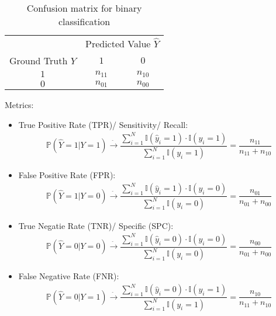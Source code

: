 \begin{table}[H]
    \centering
    \renewcommand\arraystretch{1}
    \caption{Confusion matrix for binary classification}
    \begin{tabular}{ccc}
        \hline
        \hline
        &\multicolumn{2}{c}{Predicted Value $ \hat{Y} $}\\
        \cline{2-3}
        Ground Truth $ Y $&$ 1 $&$ 0 $\\
        \hline
        $ 1 $&$ n_{11} $&$ n_{10} $\\
        $ 0  $&$ n_{01} $&$ n_{00} $\\
        \hline
        \hline
    \end{tabular}
    \label{}
\end{table}

Metrics:
\begin{itemize}[topsep=2pt,itemsep=0pt]
    \item True Positive Rate (TPR)/ Sensitivity/ Recall:
    \begin{align}
        \mathbb{P}\left( \hat{Y}=1|Y=1 \right)\xrightarrow[]{\hat{ }}\dfrac{\sum_{i=1}^N\mathbb{I}(\hat{y}_i=1)\cdot\mathbb{I}(y_i=1)}{\sum_{i=1}^N\mathbb{I}(y_i=1)} =\dfrac{n_{11}}{n_{11}+n_{10}}
    \end{align}
    \item False Positive Rate (FPR):
    \begin{align}
        \mathbb{P}\left( \hat{Y}=1|Y=0 \right)\xrightarrow[]{\hat{ }}\dfrac{\sum_{i=1}^N\mathbb{I}(\hat{y}_i=1)\cdot\mathbb{I}(y_i=0)}{\sum_{i=1}^N\mathbb{I}(y_i=0)} =\dfrac{n_{01}}{n_{01}+n_{00}}
    \end{align}
    \item True Negatie Rate (TNR)/ Specific (SPC):
    \begin{align}
        \mathbb{P}\left( \hat{Y}=0|Y=0 \right)\xrightarrow[]{\hat{ }}\dfrac{\sum_{i=1}^N\mathbb{I}(\hat{y}_i=0)\cdot\mathbb{I}(y_i=0)}{\sum_{i=1}^N\mathbb{I}(y_i=0)} =\dfrac{n_{00}}{n_{01}+n_{00}} 
    \end{align}
    \item False Negative Rate (FNR):
    \begin{align}
        \mathbb{P}\left( \hat{Y}=0|Y=1 \right)\xrightarrow[]{\hat{ }}\dfrac{\sum_{i=1}^N\mathbb{I}(\hat{y}_i=0)\cdot\mathbb{I}(y_i=1)}{\sum_{i=1}^N\mathbb{I}(y_i=1)} =\dfrac{n_{10}}{n_{11}+n_{10}}

\end{align}
\end{itemize}
